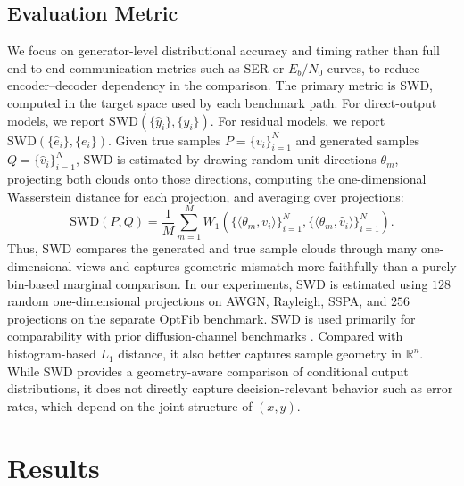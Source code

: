 \documentclass[conference]{IEEEtran}
\begin{document}
%


\subsection{Evaluation Metric}
We focus on generator-level distributional accuracy and timing rather than full end-to-end communication metrics such as SER or \(E_b/N_0\) curves, to reduce encoder--decoder dependency in the comparison.
The primary metric is SWD, computed in the target space used by each benchmark path.
For direct-output models, we report \(\mathrm{SWD}\!\left(\{\hat{y}_i\}, \{y_i\}\right)\). For residual models, we report \(\mathrm{SWD}\!\left(\{\hat{e}_i\}, \{e_i\}\right)\).
Given true samples \(P=\{v_i\}_{i=1}^N\) and generated samples \(Q=\{\hat v_i\}_{i=1}^N\), SWD is estimated by drawing random unit directions \(\theta_m\), projecting both clouds onto those directions, computing the one-dimensional Wasserstein distance for each projection, and averaging over projections:
\begin{equation*}
\mathrm{SWD}(P,Q)
=
\frac{1}{M}
\sum_{m=1}^M
W_1\!\left(\{\langle \theta_m,v_i\rangle\}_{i=1}^N,\{\langle \theta_m,\hat v_i\rangle\}_{i=1}^N\right).
\end{equation*}
Thus, SWD compares the generated and true sample clouds through many one-dimensional views and captures geometric mismatch more faithfully than a purely bin-based marginal comparison. In our experiments, SWD is estimated using \(128\) random one-dimensional projections on AWGN,
  Rayleigh, SSPA, and \(256\) projections on the separate OptFib benchmark.
SWD is used primarily for comparability with prior diffusion-channel benchmarks \cite{paper2309,kimicc2024}. Compared with histogram-based \(L_1\) distance, it also better captures sample geometry in \(\mathbb{R}^n\). While SWD provides a geometry-aware comparison of conditional output distributions, it does not directly capture decision-relevant behavior such as error rates, which depend on the joint structure of $(x,y)$.


\section{Results}
\end{document}
